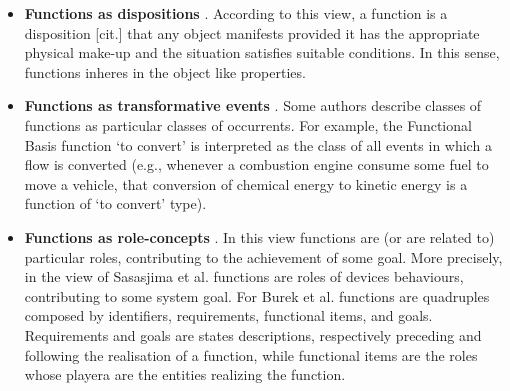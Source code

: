 \documentclass[
]{ceurart}
\begin{document}
\begin{itemize}
  \item \textbf{Functions as dispositions} \cite{arpFunctionRoleDisposition2008, barryBasicFormalOntology2015}. According to this view, a function is a disposition [cit.] that any object manifests provided it has the appropriate physical make-up and the situation satisfies suitable conditions. In this sense, functions inheres in the object like properties. 
  \item \textbf{Functions as transformative events} \cite{borgoFormalizationFunctionsOperations2011, garbaczTwoOntologydrivenFormalisations2011, garbaczStandardTaxonomyArtifact2005}. Some authors describe classes of functions as particular classes of occurrents. For example, the Functional Basis function `to convert' is interpreted as the class of all events in which a flow is converted (e.g., whenever a combustion engine consume some fuel to move a vehicle, that conversion of chemical energy to kinetic energy is a function of `to convert' type).%
  \item \textbf{Functions as role-concepts} \cite{sasajimaFBRLFunctionBehavior1995,burekToplevelOntologyFunctions2006}. In this view functions are (or are related to) particular roles, contributing to the achievement of some goal. More precisely, in the view of Sasasjima et al. \cite{sasajimaFBRLFunctionBehavior1995} functions are roles of devices behaviours, contributing to some system goal. For Burek et al. \cite{burekToplevelOntologyFunctions2006} functions are quadruples composed by identifiers, requirements, functional items, and goals. Requirements and goals are states descriptions, respectively preceding and following the realisation of a function, while functional items are the roles whose playera are the entities realizing the function. 
\end{itemize}
\end{document}
